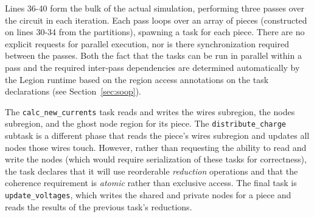 


Lines 36-40 form the bulk of the actual simulation, performing three passes
over the circuit in each iteration.  Each pass loops over an array of pieces (constructed on lines 30-34 from the partitions),
spawning a task for each piece.   There are no explicit requests for
parallel execution, nor is there synchronization required between the
passes.  Both the fact that the tasks can be run in parallel within a pass
and the required inter-pass dependencies are determined automatically
by the Legion runtime based on the region access annotations on the task declarations
(see Section~\ref{sec:soop}).

The  {\tt calc\_new\_currents} task reads and writes the wires subregion, 
the nodes subregion, and the ghost node region for its piece.
The {\tt distribute\_charge} subtask is a different phase that reads the piece's 
wires subregion and updates all nodes those wires touch.  However,
rather than requesting the ability to read and write the nodes (which would
require serialization of these tasks for correctness), the task declares that
it will use reorderable {\em reduction} operations and that the coherence requirement
is {\em atomic} rather than exclusive access. The final task is 
{\tt update\_voltages}, which writes the shared and private nodes for a piece
and reads the results of the previous task's reductions.

